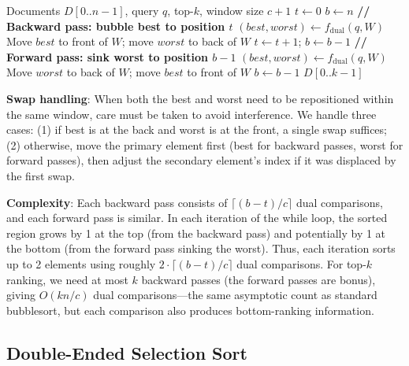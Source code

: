 \begin{algorithm}[!htbp]
\caption{Cocktail Shaker Sort for Dual-End Setwise}
\label{alg:cocktail}
\begin{algorithmic}[1]
\REQUIRE Documents $D[0..n{-}1]$, query $q$, top-$k$, window size $c{+}1$
\STATE $t \leftarrow 0$ 
\STATE $b \leftarrow n$ 
    \STATE \textbf{// Backward pass: bubble best to position $t$}
        \STATE $(best, worst) \leftarrow f_{\text{dual}}(q, W)$
        \STATE Move $best$ to front of $W$; move $worst$ to back of $W$
    \ENDFOR
    \STATE $t \leftarrow t + 1$; $b \leftarrow b - 1$
        \STATE \textbf{// Forward pass: sink worst to position $b{-}1$}
            \STATE $(best, worst) \leftarrow f_{\text{dual}}(q, W)$
            \STATE Move $worst$ to back of $W$; move $best$ to front of $W$
        \ENDFOR
        \STATE $b \leftarrow b - 1$
    \ENDIF
\ENDWHILE
\RETURN $D[0..k{-}1]$
\end{algorithmic}
\end{algorithm}

\textbf{Swap handling}: When both the best and worst need to be repositioned within the same window, care must be taken to avoid interference. We handle three cases: (1) if best is at the back and worst is at the front, a single swap suffices; (2) otherwise, move the primary element first (best for backward passes, worst for forward passes), then adjust the secondary element's index if it was displaced by the first swap.

\textbf{Complexity}: Each backward pass consists of $\lceil(b-t)/c\rceil$ dual comparisons, and each forward pass is similar. In each iteration of the while loop, the sorted region grows by 1 at the top (from the backward pass) and potentially by 1 at the bottom (from the forward pass sinking the worst). Thus, each iteration sorts up to 2 elements using roughly $2 \cdot \lceil(b-t)/c\rceil$ dual comparisons. For top-$k$ ranking, we need at most $k$ backward passes (the forward passes are bonus), giving $O(kn/c)$ dual comparisons---the same asymptotic count as standard bubblesort, but each comparison also produces bottom-ranking information.


\subsection{Double-Ended Selection Sort}

